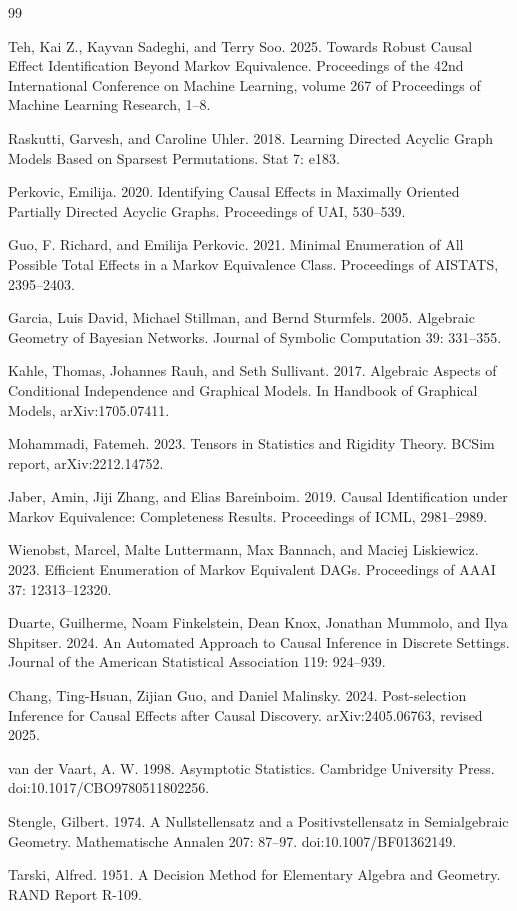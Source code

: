 \documentclass{article}
\begin{document}
\begin{thebibliography}{99}

   Teh, Kai Z., Kayvan Sadeghi, and Terry Soo. 2025. Towards Robust Causal Effect Identification Beyond Markov Equivalence. Proceedings of the 42nd International Conference on Machine Learning, volume 267 of Proceedings of Machine Learning Research, 1--8.

   Raskutti, Garvesh, and Caroline Uhler. 2018. Learning Directed Acyclic Graph Models Based on Sparsest Permutations. Stat 7: e183.

   Perkovic, Emilija. 2020. Identifying Causal Effects in Maximally Oriented Partially Directed Acyclic Graphs. Proceedings of UAI, 530--539.

   Guo, F. Richard, and Emilija Perkovic. 2021. Minimal Enumeration of All Possible Total Effects in a Markov Equivalence Class. Proceedings of AISTATS, 2395--2403.

   Garcia, Luis David, Michael Stillman, and Bernd Sturmfels. 2005. Algebraic Geometry of Bayesian Networks. Journal of Symbolic Computation 39: 331--355.

   Kahle, Thomas, Johannes Rauh, and Seth Sullivant. 2017. Algebraic Aspects of Conditional Independence and Graphical Models. In Handbook of Graphical Models, arXiv:1705.07411.

   Mohammadi, Fatemeh. 2023. Tensors in Statistics and Rigidity Theory. BCSim report, arXiv:2212.14752.

   Jaber, Amin, Jiji Zhang, and Elias Bareinboim. 2019. Causal Identification under Markov Equivalence: Completeness Results. Proceedings of ICML, 2981--2989.

   Wienobst, Marcel, Malte Luttermann, Max Bannach, and Maciej Liskiewicz. 2023. Efficient Enumeration of Markov Equivalent DAGs. Proceedings of AAAI 37: 12313--12320.

   Duarte, Guilherme, Noam Finkelstein, Dean Knox, Jonathan Mummolo, and Ilya Shpitser. 2024. An Automated Approach to Causal Inference in Discrete Settings. Journal of the American Statistical Association 119: 924--939.

   Chang, Ting-Hsuan, Zijian Guo, and Daniel Malinsky. 2024. Post-selection Inference for Causal Effects after Causal Discovery. arXiv:2405.06763, revised 2025.

   van der Vaart, A. W. 1998. Asymptotic Statistics. Cambridge University Press. doi:10.1017/CBO9780511802256.

   Stengle, Gilbert. 1974. A Nullstellensatz and a Positivstellensatz in Semialgebraic Geometry. Mathematische Annalen 207: 87--97. doi:10.1007/BF01362149.

   Tarski, Alfred. 1951. A Decision Method for Elementary Algebra and Geometry. RAND Report R-109.

\end{thebibliography}
\end{document}
